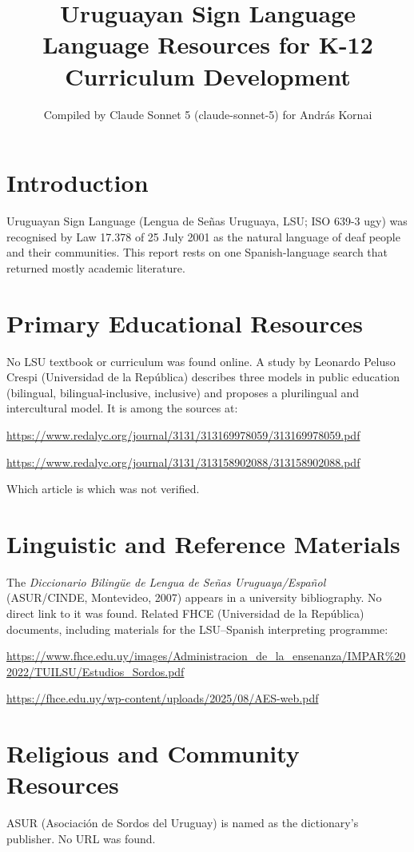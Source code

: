 \documentclass[12pt]{article}
\title{Uruguayan Sign Language Language Resources for K-12 Curriculum Development}
\author{Compiled by Claude Sonnet 5 (claude-sonnet-5) for Andr\'as Kornai}
\date{}
\begin{document}
\maketitle

\section{Introduction}
Uruguayan Sign Language (Lengua de Se\~nas Uruguaya, LSU; ISO 639-3 ugy) was recognised by Law 17.378 of 25 July 2001 as the natural language of deaf people and their communities. This report rests on one Spanish-language search that returned mostly academic literature.

\section{Primary Educational Resources}
No LSU textbook or curriculum was found online. A study by Leonardo Peluso Crespi (Universidad de la Rep\'ublica) describes three models in public education (bilingual, bilingual-inclusive, inclusive) and proposes a plurilingual and intercultural model. It is among the sources at:

\url{https://www.redalyc.org/journal/3131/313169978059/313169978059.pdf}

\url{https://www.redalyc.org/journal/3131/313158902088/313158902088.pdf}

Which article is which was not verified.

\section{Linguistic and Reference Materials}
The \emph{Diccionario Biling\"ue de Lengua de Se\~nas Uruguaya/Espa\~nol} (ASUR/CINDE, Montevideo, 2007) appears in a university bibliography. No direct link to it was found. Related FHCE (Universidad de la Rep\'ublica) documents, including materials for the LSU--Spanish interpreting programme:

\url{https://www.fhce.edu.uy/images/Administracion_de_la_ensenanza/IMPAR\%202022/TUILSU/Estudios_Sordos.pdf}

\url{https://fhce.edu.uy/wp-content/uploads/2025/08/AES-web.pdf}

\section{Religious and Community Resources}
ASUR (Asociaci\'on de Sordos del Uruguay) is named as the dictionary's publisher. No URL was found.
\end{document}
